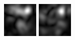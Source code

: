 \begin{figure}[ht]
\begin{center}
 \includegraphics[width=\columnwidth/9]{ch4/figures/mag_1_5.jpg}
 \includegraphics[width=\columnwidth/9]{ch4/figures/mag_1_6.jpg}

\end{center}
\end{figure}
